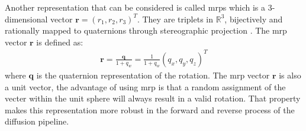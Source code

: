 \documentclass[12pt,DIV14,BCOR12mm,a4paper,footinclude=false,headinclude,parskip=half-,twoside,openright,cleardoublepage=empty,toc=index,bibliography=totoc,listof=totoc]{scrreprt}
\numberwithin{equation}{chapter}
\begin{document}
Another representation that can be considered is called \glspl{mrp} which is a 3-dimensional vector $\mathbf{r} = (r_{1}, r_{2}, r_{3})^{T}$. They are triplets in $\mathbb{R}^{3} $, bijectively and rationally mapped to quaternions through stereographic projection \cite{rodrigues}. The \gls{mrp} vector $\mathbf{r}$ is defined as:
\begin{align}
  \mathbf{r} = \frac{\mathbf{q}}{1+q_{w}} = \frac{1}{1+q_{w}}(q_{x}, q_{y}, q_{z})^{T}
\end{align}
where $\mathbf{q}$ is the quaternion representation of the rotation. The \gls{mrp} vector $\mathbf{r}$ is also a unit vector, the advantage of using \gls{mrp} is that a random assignment of the vecter within the unit sphere will always result in a valid rotation. That property makes this representation more robust in the forward and reverse process of the diffusion pipeline.
\end{document}
